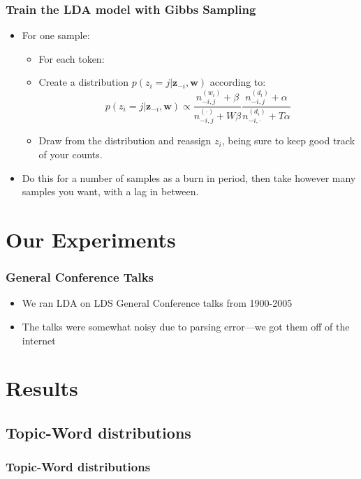 \documentclass{beamer}
\begin{document}
\begin{frame}
  \frametitle{Train the LDA model with Gibbs Sampling}
  \begin{itemize}
	\item For one sample:
	  \begin{itemize}
		\item For each token:
		\item Create a distribution $p(z_i=j|\mathbf{z}_{-i},\mathbf{w})$
		  according to:
		  \[p(z_i = j|\mathbf{z}_{-i},\mathbf{w}) \propto 
		  \frac{n_{-i,j}^{(w_i)}+\beta}{n_{-i,j}^{(\cdot)}+W\beta}
		  \frac{n_{-i,j}^{(d_i)}+\alpha}{n_{-i,\cdot}^{(d_i)}+T\alpha}\]
		\item Draw from the distribution and reassign $z_i$, being sure to 
		  keep good track of your counts.
	  \end{itemize}
	\item Do this for a number of samples as a burn in period, then take however
	  many samples you want, with a lag in between.
  \end{itemize}
\end{frame}

\section{Our Experiments}

\begin{frame}
  \frametitle{General Conference Talks}
  \begin{itemize}
	\item We ran LDA on LDS General Conference talks from 1900-2005
	  \pause
	\item The talks were somewhat noisy due to parsing error---we got them
	  off of the internet
  \end{itemize}
\end{frame}

\section{Results}

\subsection{Topic-Word distributions}

\begin{frame}
  \frametitle{Topic-Word distributions}
\end{frame}
\end{document}
